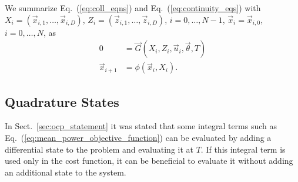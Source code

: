 \documentclass[a4paper,12pt]{article}
\newcommand{\refeq}[1]{Eq.~(\ref{#1})}
\newcommand{\refsec}[1]{Sect.~\ref{#1}}
\begin{document}
We summarize \refeq{eq:coll_eqns} and \refeq{eq:continuity_eqs} with $X_i = (\vec{x}_{i,1},\dots,\vec{x}_{i,D})$, $Z_i = (\vec{z}_{i,1},\dots,\vec{z}_{i,D})$, $i=0,\dots,N-1$, $\vec{x}_i=\vec{x}_{i,0}$, $i=0,\dots,N$, as
\begin{equation}
\begin{aligned}
0 &= \vec{G}(X_i,Z_i,\vec{u}_i,\vec{\theta},T) \\
\vec{x}_{i+1} &= \phi(\vec{x}_i,X_i).
\label{eq:coll_eqns_summary}
\end{aligned}
\end{equation}

\subsection{Quadrature States}
\label{sec:quadrature_states}
In \refsec{sec:ocp_statement} it was stated that some integral terms such as \refeq{eq:mean_power_objective_function} can be evaluated by adding a differential state to the problem and evaluating it at $T$.
If this integral term is used only in the cost function, it can be beneficial to evaluate it without adding an additional state to the system.
\end{document}
